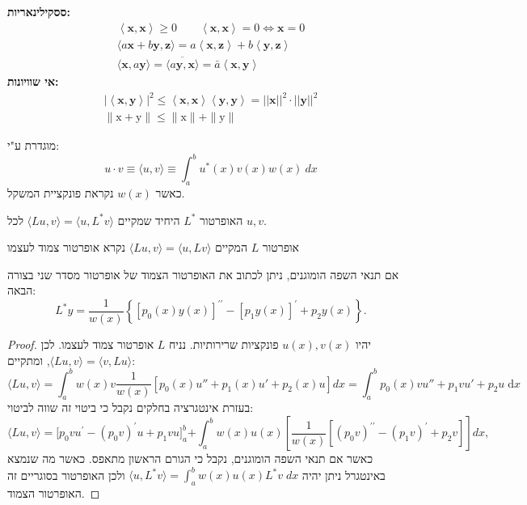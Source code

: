 \documentclass{tstextbook}
\begin{document}
\begin{reminder}
\textbf{ססקילינאריות:}\begin{gather*}\left\langle \mathbf{x},\mathbf{x} \right\rangle\geq0 \qquad \left\langle  \mathbf{x},\mathbf{x} \right\rangle=0\iff \mathbf{x}=0 \\ \langle a\mathbf{x}+b\mathbf{y},\mathbf{z}\rangle=a\left\langle\mathbf{x},\mathbf{z}\right\rangle+b\left\langle\mathbf{y},\mathbf{z}\right\rangle \\ \langle\mathbf{x},a\mathbf{y}\rangle=\overline{\langle a\mathbf{y},\mathbf{x}\rangle}=\bar{a}\left\langle\mathbf{x},\mathbf{y}\right\rangle
\end{gather*}\textbf{אי שוויונות:}\begin{gather*}\left|\left\langle \mathbf{x},\mathbf{y} \right\rangle\right|^2\leq\left\langle\mathbf{x},\mathbf{x}\right\rangle\left\langle\mathbf{y},\mathbf{y}\right\rangle=||\mathbf{x}||^2\cdot ||\mathbf{y}||^2\\ \|\mathrm{x}+\mathrm{y}\|\leq\|\mathrm{x}\|+\|\mathrm{y}\|
\end{gather*}

\end{reminder}
\begin{definition}
מוגדרת ע"י:
$$ u\cdot v \equiv\langle u,v\rangle\equiv\int_a^bu^*(x)v(x)w(x)\:dx$$
כאשר \(w(x)\) נקראת פונקציית המשקל.

\end{definition}
\begin{definition}
האופרטור \(L^*\) היחיד שמקיים \(\langle Lu, v \rangle=\langle u, L^*v \rangle\) לכל \(u,v\).

\end{definition}
\begin{definition}
אופרטור \(L\) המקיים \(\langle Lu, v \rangle=\langle u, Lv \rangle\) נקרא אופרטור צמוד לעצמו

\end{definition}
\begin{proposition}
אם תנאי השפה הומוגנים, ניתן לכתוב את האופרטור הצמוד של אופרטור מסדר שני בצורה הבאה:
$$L^{*}y=\frac{1}{w(x)}\left\{\left[p_{0}(x)y(x)\right]^{\prime\prime}-\left[p_{1}y(x)\right]^{\prime}+p_{2}y(x)\right\}.$$

\end{proposition}
\begin{proof}
יהיו \(u(x),v(x)\) פונקציות שרירותיות. נניח \(L\) אופרטור צמוד לעצמו. לכן \(\langle Lu, v \rangle=\langle v, Lu \rangle\), ומתקיים:
$$\langle Lu, v \rangle \!=\!\int_{a}^b \!\!w(x)v\frac{1}{w(x)}\left[ p_0(x)u''\!+\!p_1(x)u'+p_2(x)u \right]dx\!=\!\int_{a}^b \!\!p_{0}(x)vu''+p_{1}vu'+p_{2}u\;\mathrm{d}x$$
בעזרת אינטגרציה בחלקים נקבל כי ביטוי זה שווה לביטוי:
$${{\displaystyle\langle Lu,v\rangle}}{{=}}{{\biggl[p_{0}v u^{\prime}-(p_{0}v)^{\prime}u+p_{1}v u\biggr]_{a}^{b}}}{{+\displaystyle\int_{a}^{b}w(x)u(x)\left[\frac{1}{w(x)}\left[(p_{0}v)^{\prime\prime}-(p_{1}v)^{\prime}+p_{2}v\right]\right]d x,}}$$
כאשר אם תנאי השפה הומוגנים, נקבל כי הגורם הראשון מתאפס. כאשר מה שנמצא באינטגרל ניתן יהיה \(\langle u, L^*v \rangle=\int_{a}^b w(x)u(x)L^*v\;dx\) ולכן האופרטור בסוגריים זה האופרטור הצמוד.

\end{proof}
\end{document}

